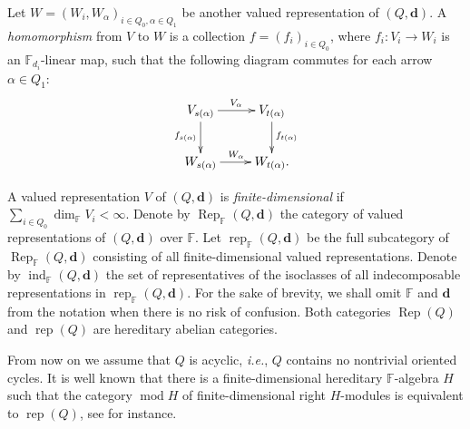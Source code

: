 \documentclass[12pt,reqno]{amsart}
\numberwithin{equation}{section}
\newcommand{\ie}{{\em i.e.}}
\renewcommand{\mod}{\operatorname{mod}\nolimits}
\newcommand{\rep}{\operatorname{rep}\nolimits}
\renewcommand{\dim}{\operatorname{dim}\nolimits}
\begin{document}
	Let $W=(W_i,W_\alpha)_{i\in Q_0,\alpha\in Q_1}$ be another valued representation of $(Q,\mathbf{d})$. A {\it homomorphism} from $V$ to $W$
	is a collection $f=(f_i)_{i\in Q_0}$, where $f_i:V_i\rightarrow W_i$ is an $\mathbb{F}_{d_i}$-linear map, such that  the following diagram commutes for each arrow $\alpha\in Q_1$:
	\[
	\xymatrix{V_{s(\alpha)}\ar[d]_{f_{s(\alpha)}}\ar[r]^{V_\alpha}&V_{t(\alpha)}\ar[d]^{f_{t(\alpha)}}\\
		W_{s(\alpha)}\ar[r]^{W_{\alpha}}&W_{t(\alpha)}.}
	\]
	
	A valued representation $V$ of $(Q,\mathbf{d})$ is {\it finite-dimensional} if $\sum_{i\in Q_0}\dim_{\mathbb{F}}V_i<\infty$. Denote by $\operatorname{Rep}_{\mathbb{F}}(Q,\mathbf{d})$ the category of valued representations of $(Q,\mathbf{d})$ over $\mathbb{F}$. Let $\operatorname{rep}_{\mathbb{F}}(Q,\mathbf{d})$ be the full subcategory of $\operatorname{Rep}_{\mathbb{F}}(Q,\mathbf{d})$ consisting of all finite-dimensional valued representations. Denote by $\operatorname{ind}_{\mathbb{F}}(Q,\mathbf{d})$ the set of representatives of the isoclasses of all indecomposable representations in $\rep_{\mathbb{F}}(Q,\mathbf{d})$.
	For the sake of brevity, we shall omit $\mathbb{F}$ and $\mathbf{d}$ from the notation when there is no risk of confusion. Both categories $\operatorname{Rep}(Q)$ and $\operatorname{rep}(Q)$ are hereditary abelian categories.
	
	
	
	From now on we assume that $Q$ is acyclic, \ie, $Q$ contains no nontrivial oriented cycles.  
	It is well known that there is
	a finite-dimensional hereditary $\mathbb{F}$-algebra $H$ such that the category $\mod H$ of finite-dimensional right $H$-modules is equivalent to $\rep(Q)$, see \cite{Ru11} for instance.
	
\end{document}
